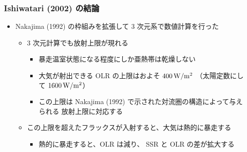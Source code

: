 \documentclass[aspectratio=149,9pt,fleqn]{beamer}
\begin{document}

\begin{frame}
	\frametitle{Ishiwatari \etal (2002) の結論}
	\begin{itemize}
		\item Nakajima \etal (1992) の枠組みを拡張して 3 次元系で数値計算を行った
		\begin{itemize}
			\item 3 次元計算でも放射上限が現れる
				\begin{itemize}
					\item 暴走温室状態になる程度にしか亜熱帯は乾燥しない
					\item 大気が射出できる OLR の上限はおよそ \(400\hmu{W/m^2}\)
						（太陽定数にして \(1600\hmu{W/m^2}\)）
					\item この上限は Nakajima \etal (1992) で示された対流圏の構造によって与えられる
						放射上限に対応する
				\end{itemize}
			\item この上限を超えたフラックスが入射すると、大気は熱的に暴走する
				\begin{itemize}
					\item 熱的に暴走すると、OLR は減り、 SSR と OLR の差が拡大する
				\end{itemize}
		\end{itemize}
	\end{itemize}
\end{frame}
\end{document}
